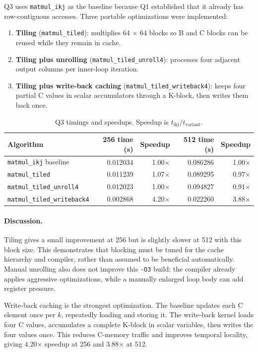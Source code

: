 \documentclass[11pt]{article}
\begin{document}
Q3 uses \texttt{matmul\_ikj} as the baseline because Q1 established that it already has row-contiguous accesses. Three portable optimizations were implemented:

\begin{enumerate}
  \item \textbf{Tiling} (\texttt{matmul\_tiled}): multiplies 64 $\times$ 64 blocks so B and C blocks can be reused while they remain in cache.
  \item \textbf{Tiling plus unrolling} (\texttt{matmul\_tiled\_unroll4}): processes four adjacent output columns per inner-loop iteration.
  \item \textbf{Tiling plus write-back caching} (\texttt{matmul\_tiled\_writeback4}): keeps four partial C values in scalar accumulators through a K-block, then writes them back once.
\end{enumerate}

\begin{table}[h]
\centering
\caption{Q3 timings and speedups. Speedup is $t_{\mathrm{ikj}}/t_{\mathrm{variant}}$.}\label{tab:q3}
\begin{tabular}{lrrrr}
\toprule
Algorithm & 256 time (s) & Speedup & 512 time (s) & Speedup \\
\midrule
\texttt{matmul\_ikj} baseline & 0.012034 & 1.00$\times$ & 0.086286 & 1.00$\times$ \\
\texttt{matmul\_tiled} & 0.011239 & 1.07$\times$ & 0.089295 & 0.97$\times$ \\
\texttt{matmul\_tiled\_unroll4} & 0.012023 & 1.00$\times$ & 0.094827 & 0.91$\times$ \\
\texttt{matmul\_tiled\_writeback4} & 0.002868 & 4.20$\times$ & 0.022260 & 3.88$\times$ \\
\bottomrule
\end{tabular}
\end{table}

\paragraph{Discussion.} Tiling gives a small improvement at 256 but is slightly slower at 512 with this block size. This demonstrates that blocking must be tuned for the cache hierarchy and compiler, rather than assumed to be beneficial automatically. Manual unrolling also does not improve this \texttt{-O3} build: the compiler already applies aggressive optimizations, while a manually enlarged loop body can add register pressure.

Write-back caching is the strongest optimization. The baseline updates each C element once per $k$, repeatedly loading and storing it. The write-back kernel loads four C values, accumulates a complete K-block in scalar variables, then writes the four values once. This reduces C-memory traffic and improves temporal locality, giving 4.20$\times$ speedup at 256 and 3.88$\times$ at 512.
\end{document}
